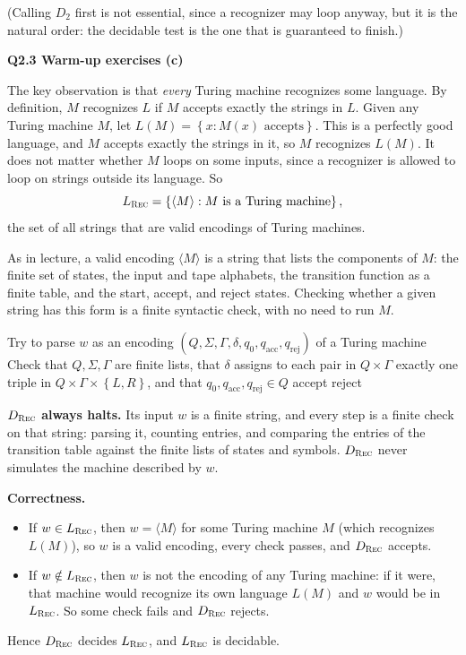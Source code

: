 \documentclass[11pt]{article}
\newcommand{\set}[1]{\left\{#1\right\}}
\newcommand{\inner}[1]{\langle #1 \rangle}
\newcommand{\Lrec}{L_{\textsc{Rec}}}
\newcommand{\qpage}[1]{\clearpage\noindent\textbf{\large #1}\par\medskip}
\begin{document}
(Calling $D_2$ first is not essential, since a recognizer may loop anyway, but it is the natural order: the decidable test is the one that is guaranteed to finish.)

\qpage{Q2.3 Warm-up exercises (c)}

The key observation is that \emph{every} Turing machine recognizes some language.
By definition, $M$ recognizes $L$ if $M$ accepts exactly the strings in $L$.
Given any Turing machine $M$, let $L(M) = \set{x : M(x) \text{ accepts}}$.
This is a perfectly good language, and $M$ accepts exactly the strings in it, so $M$ recognizes $L(M)$.
It does not matter whether $M$ loops on some inputs, since a recognizer is allowed to loop on strings outside its language.
So
\[
  \Lrec = \set{\inner{M} : M \text{ is a Turing machine}},
\]
the set of all strings that are valid encodings of Turing machines.

As in lecture, a valid encoding $\inner{M}$ is a string that lists the components of $M$: the finite set of states, the input and tape alphabets, the transition function as a finite table, and the start, accept, and reject states.
Checking whether a given string has this form is a finite syntactic check, with no need to run $M$.

\begin{algorithmic}[1]
  \Ensure{accept if $w \in \Lrec$, reject otherwise}
    \State Try to parse $w$ as an encoding $(Q, \Sigma, \Gamma, \delta, q_0, q_{\text{acc}}, q_{\text{rej}})$ of a Turing machine
    \State Check that $Q, \Sigma, \Gamma$ are finite lists, that $\delta$ assigns to each pair in $Q \times \Gamma$ exactly one triple in $Q \times \Gamma \times \set{L, R}$, and that $q_0, q_{\text{acc}}, q_{\text{rej}} \in Q$
     \Return accept
    \Else{} \Return reject
    \EndIf
  \EndFunction
\end{algorithmic}

\textbf{$D_{\textsc{Rec}}$ always halts.}
Its input $w$ is a finite string, and every step is a finite check on that string: parsing it, counting entries, and comparing the entries of the transition table against the finite lists of states and symbols.
$D_{\textsc{Rec}}$ never simulates the machine described by $w$.

\textbf{Correctness.}
\begin{itemize}
  \item If $w \in \Lrec$, then $w = \inner{M}$ for some Turing machine $M$ (which recognizes $L(M)$), so $w$ is a valid encoding, every check passes, and $D_{\textsc{Rec}}$ accepts.
  \item If $w \notin \Lrec$, then $w$ is not the encoding of any Turing machine: if it were, that machine would recognize its own language $L(M)$ and $w$ would be in $\Lrec$.
  So some check fails and $D_{\textsc{Rec}}$ rejects.
\end{itemize}
Hence $D_{\textsc{Rec}}$ decides $\Lrec$, and $\Lrec$ is decidable.
\end{document}
